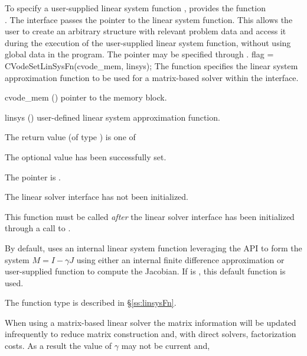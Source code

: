To specify a user-supplied linear system function , {\cvls} provides
the function\\ . The {\cvls} interface passes the pointer
 to the linear system function. This allows the user to create an
arbitrary structure with relevant problem data and access it during the
execution of the user-supplied linear system function, without using global data
in the program. The pointer  may be specified through
.
{
  flag = CVodeSetLinSysFn(cvode\_mem, linsys);
}
{
  The function  specifies the linear system approximation
  function to be used for a matrix-based solver within the {\cvls} interface.
}
{
  \begin{args}
  \item[cvode\_mem] ()
    pointer to the {\cvodes} memory block.
  \item[linsys] ()
    user-defined linear system approximation function.
  \end{args}
}
{
  The return value  (of type ) is one of
  \begin{args}
  \item[\Id{CVLS\_SUCCESS}]
    The optional value has been successfully set.
  \item[\Id{CVLS\_MEM\_NULL}]
    The  pointer is .
  \item[\Id{CVLS\_LMEM\_NULL}]
    The {\cvls} linear solver interface has not been initialized.
  \end{args}
}
{
  This function must be called \emph{after} the {\cvls} linear solver
  interface has been initialized through a call to
  .

  By default, {\cvls} uses an internal linear system function leveraging the
  {\sunmatrix} API to form the system $M = I - \gamma J$ using either an
  internal finite difference approximation or user-supplied function to compute
  the Jacobian. If  is , this default function is used.

  The function type  is described in \S\ref{ss:linsysFn}.
}
When using a matrix-based linear solver the matrix information will be updated
infrequently to reduce matrix construction and, with direct solvers,
factorization costs. As a result the value of $\gamma$ may not be current and,
